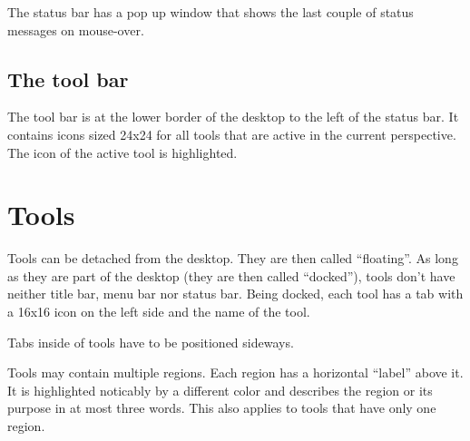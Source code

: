 \documentclass[12pt]{book}
\begin{document}
The status bar has a pop up window that shows the last couple of status messages on mouse-over.


\subsection{The tool bar}

The tool bar is at the lower border of the desktop to the left of the status bar. It contains icons sized 24x24 for all tools that are active in the current perspective. The icon of the active tool is highlighted.



\section{Tools \label{sec:tools}}

Tools can be detached from the desktop. They are then called ``floating''. As long as they are part of the desktop (they are then called ``docked''), tools don't have neither title bar, menu bar nor status bar. Being docked, each tool has a tab with a 16x16 icon on the left side and the name of the tool.



Tabs inside of tools have to be positioned sideways.


Tools may contain multiple regions. Each region has a horizontal ``label'' above it. It is highlighted noticably by a different color and describes the region or its purpose in at most three words. This also applies to tools that have only one region.
\end{document}
